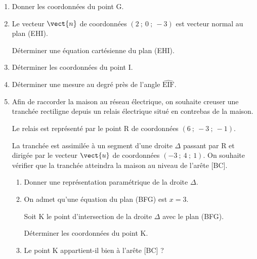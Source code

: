 \begin{enumerate}
\item Donner les coordonnées du point G.
\item Le vecteur $\vect{n}$ de coordonnées $(2~;~0~;~-3)$ est vecteur normal au plan (EHI).

Déterminer une équation cartésienne du plan (EHI).
\item Déterminer les coordonnées du point I.
\item Déterminer une mesure au degré près de l'angle $\widehat{\text{EIF}}$.
\item Afin de raccorder la maison au réseau électrique, on souhaite creuser une tranchée rectiligne depuis un relais électrique situé en contrebas de la maison.

Le relais est représenté par le point R de coordonnées $(6~;~- 3~;~- 1)$.

La tranchée est assimilée à un segment d'une droite $\Delta$ passant par R et dirigée par le vecteur $\vect{u}$ de coordonnées $(-3~;~4~;~1)$. On souhaite vérifier que la tranchée atteindra la maison au niveau de l'arête [BC].
	\begin{enumerate}
		\item Donner une représentation paramétrique de la droite $\Delta$.
		\item On admet qu'une équation du plan (BFG) est $x = 3$.
		
Soit K le point d'intersection de la droite $\Delta$ avec le plan (BFG).

Déterminer les coordonnées du point K.
		\item Le point K appartient-il bien à l'arête [BC] ?
	\end{enumerate}
\end{enumerate}

\bigskip
